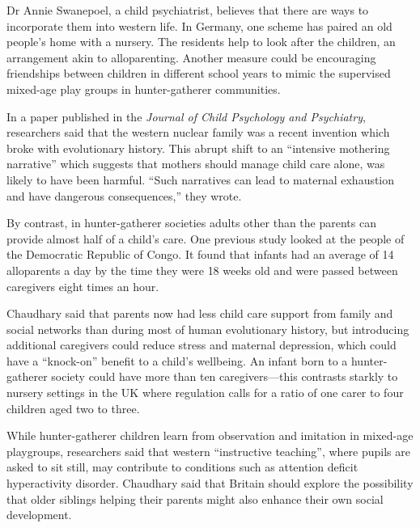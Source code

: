 \documentclass[12pt,a4paper]{article}
\begin{document}
\begin{reading}
\begin{examtext}
Dr Annie Swanepoel, a child psychiatrist, believes that there are ways to incorporate them into western life. In Germany, one scheme has paired an old people's home with a nursery. The residents help to look after the children, an arrangement akin to alloparenting. Another measure could be encouraging friendships between children in different school years to mimic the supervised mixed-age play groups in hunter-gatherer communities.

In a paper published in the \textit{Journal of Child Psychology and Psychiatry}, researchers said that the western nuclear family was a recent invention which broke with evolutionary history. This abrupt shift to an ``intensive mothering narrative'' which suggests that mothers should manage child care alone, was likely to have been harmful. ``Such narratives can lead to maternal exhaustion and have dangerous consequences,'' they wrote.

By contrast, in hunter-gatherer societies adults other than the parents can provide almost half of a child's care. One previous study looked at the people of the Democratic Republic of Congo. It found that infants had an average of 14 alloparents a day by the time they were 18 weeks old and were passed between caregivers eight times an hour.

Chaudhary said that parents now had less child care support from family and social networks than during most of human evolutionary history, but introducing additional caregivers could reduce stress and maternal depression, which could have a ``knock-on'' benefit to a child's wellbeing. An infant born to a hunter-gatherer society could have more than ten caregivers---this contrasts starkly to nursery settings in the UK where regulation calls for a ratio of one carer to four children aged two to three.

While hunter-gatherer children learn from observation and imitation in mixed-age playgroups, researchers said that western ``instructive teaching'', where pupils are asked to sit still, may contribute to conditions such as attention deficit hyperactivity disorder. Chaudhary said that Britain should explore the possibility that older siblings helping their parents might also enhance their own social development.
\end{examtext}



\end{reading}
\end{document}
